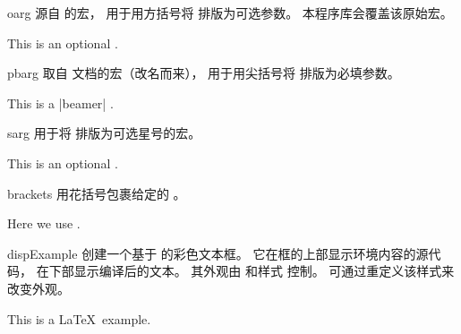 \begin{docCommand}{oarg}{}
  源自  \cite{carlisle:ltxdoc} 的宏，
  用于用方括号将  排版为可选参数。
  本程序库会覆盖该原始宏。
\begin{dispExample}
This is an optional .
\end{dispExample}
\end{docCommand}

\clearpage

\begin{docCommand}[doc new={2025-05-28}]{pbarg}{}
  取自  \cite{tantau:beamer} 文档的宏（改名而来），
  用于用尖括号将  排版为必填参数。
\begin{dispExample}
This is a |beamer| .
\end{dispExample}
\end{docCommand}


\begin{docCommand}[doc new=2023-02-16]{sarg}{}
  用于将 \sarg{} 排版为可选星号的宏。
\begin{dispExample}
This is an optional \sarg.
\end{dispExample}
\end{docCommand}


\begin{docCommand}{brackets}{}
  用花括号包裹给定的 。
\begin{dispExample}
  Here we use .
\end{dispExample}
\end{docCommand}


{\let\xdispExample\dispExample
  \let\endxdispExample\enddispExample
\begin{docEnvironment}[doc updated=2014-10-10]{dispExample}{}
  创建一个基于  的彩色文本框。
  它在框的上部显示环境内容的源代码，
  在下部显示编译后的文本。
  其外观由 
  和样式  控制。
  可通过重定义该样式来改变外观。
{
\begin{xdispExample}
\begin{dispExample}
This is a \LaTeX\ example.
\end{dispExample}
\end{xdispExample}
}
\end{docEnvironment}}


